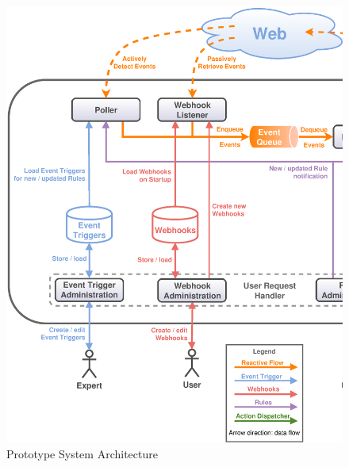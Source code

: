 \begin{figure}[!ht]
	\centering
  \includegraphics[width=\textwidth]{figures/Architecture_Final}
	\caption{Prototype System Architecture}
	\label{fig:Architecture}
\end{figure}



